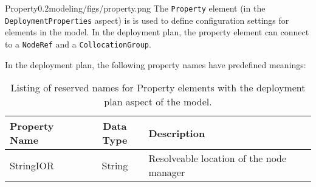 \begin{modelelement}{Property}{0.2}{modeling/figs/property.png}
The \texttt{Property} element (in the \texttt{DeploymentProperties}
aspect) is is used to define configuration
settings for elements in the model. In the deployment plan, the
property element can connect to a \texttt{NodeRef} and a 
\texttt{CollocationGroup}.

In the deployment plan, the following property names have
predefined meanings:
\begin{table}[htbp]
  \centering
  \begin{tabular}{lcl}
  \hline
  \textbf{Property Name} & \textbf{Data Type} & \textbf{Description}\\
  \hline
  StringIOR & String & Resolveable location of the node manager \\
  \end{tabular}

  \caption{Listing of reserved names for Property elements with the deployment
  plan aspect of the model.}
  \label{table:deployment-properties}
\end{table}
\end{modelelement}
